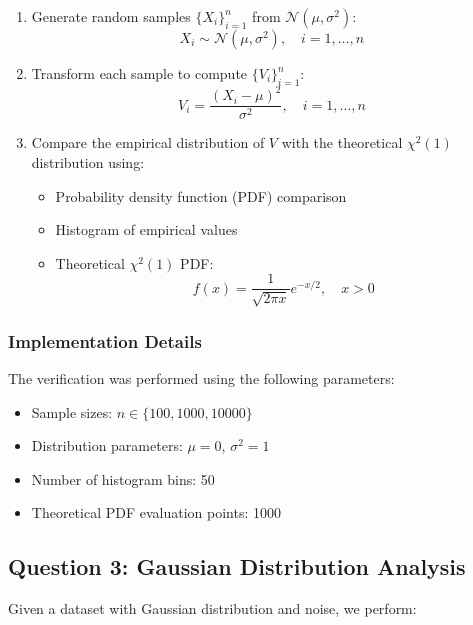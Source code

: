 \documentclass[12pt]{article}
\begin{document}
\begin{enumerate}
    \item Generate random samples $\{X_i\}_{i=1}^n$ from $\mathcal{N}(\mu, \sigma^2)$:
    \begin{equation}
        X_i \sim \mathcal{N}(\mu, \sigma^2), \quad i = 1,\ldots,n
    \end{equation}
    
    \item Transform each sample to compute $\{V_i\}_{i=1}^n$:
    \begin{equation}
        V_i = \frac{(X_i-\mu)^2}{\sigma^2}, \quad i = 1,\ldots,n
    \end{equation}
    
    \item Compare the empirical distribution of $V$ with the theoretical $\chi^2(1)$ distribution using:
    \begin{itemize}
        \item Probability density function (PDF) comparison
        \item Histogram of empirical values
        \item Theoretical $\chi^2(1)$ PDF:
        \begin{equation}
            f(x) = \frac{1}{\sqrt{2\pi x}}e^{-x/2}, \quad x > 0
        \end{equation}
    \end{itemize}
\end{enumerate}

\subsubsection{Implementation Details}
The verification was performed using the following parameters:
\begin{itemize}
    \item Sample sizes: $n \in \{100, 1000, 10000\}$
    \item Distribution parameters: $\mu = 0$, $\sigma^2 = 1$
    \item Number of histogram bins: 50
    \item Theoretical PDF evaluation points: 1000
\end{itemize}

\subsection{Question 3: Gaussian Distribution Analysis}
Given a dataset with Gaussian distribution and noise, we perform:
\end{document}

